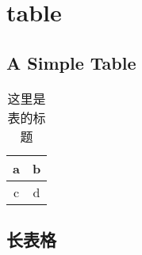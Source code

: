 \chapter{table}
\section{A Simple Table}
\begin{table}[htbp]
\centering
\caption{这里是表的标题} \label{tab:simpletable}
\begin{tabular}{|c|c|}
    \hline
    a & b \\
    \hline
    c & d \\
    \hline
\end{tabular}
\end{table}

\section{长表格}
